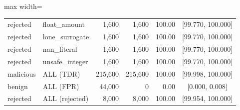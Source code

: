 \begin{table}[t]
\begin{adjustbox}{max width=\textwidth}
\begin{tabular}{llrrrc}
rejected & float\_amount & 1,600 & 1,600 & 100.00 & [99.770, 100.000] \\
rejected & lone\_surrogate & 1,600 & 1,600 & 100.00 & [99.770, 100.000] \\
rejected & nan\_literal & 1,600 & 1,600 & 100.00 & [99.770, 100.000] \\
rejected & unsafe\_integer & 1,600 & 1,600 & 100.00 & [99.770, 100.000] \\
malicious & ALL (TDR) & 215,600 & 215,600 & 100.00 & [99.998, 100.000] \\
benign & ALL (FPR) & 44,000 & 0 & 0.00 & [0.000, 0.008] \\
rejected & ALL (rejected) & 8,000 & 8,000 & 100.00 & [99.954, 100.000] \\
\bottomrule
\end{tabular}\end{adjustbox}
\end{table}
